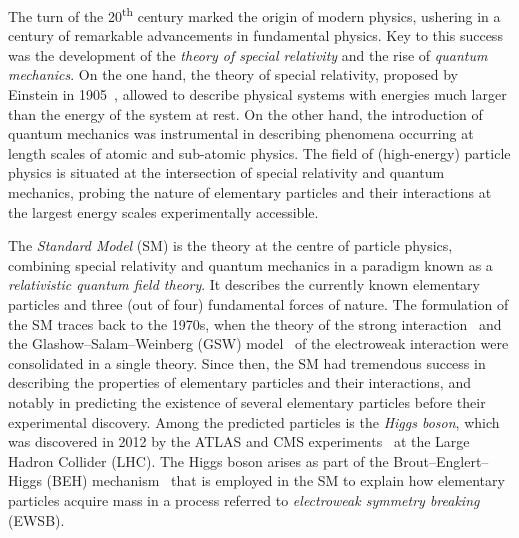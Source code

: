The turn of the 20\textsuperscript{th} century marked the origin of modern
physics, ushering in a century of remarkable advancements in fundamental
physics. Key to this success was the development of the \emph{theory of special
  relativity} and the rise of \emph{quantum mechanics}. On the one hand, the
theory of special relativity, proposed by Einstein in
1905~\cite{einstein:1905zedbk,einstein:1905idtekvsea}, allowed to describe
physical systems with energies much larger than the energy of the system at
rest. On the other hand, the introduction of quantum mechanics was instrumental
in describing phenomena occurring at length scales of atomic and sub-atomic
physics. The field of (high-energy) particle physics is situated at the
intersection of special relativity and quantum mechanics, probing the nature of
elementary particles and their interactions at the largest energy scales
experimentally accessible.

The \emph{Standard Model} (SM) is the theory at the centre of particle physics,
combining special relativity and quantum mechanics in a paradigm known as a
\emph{relativistic quantum field theory}. It describes the currently known
elementary particles and three (out of four) fundamental forces of nature. The
formulation of the SM traces back to the 1970s, when the theory of the strong
interaction~\cite{Fritzsch:1973pi,Gross:1973id,Politzer:1973fx}
and the Glashow--Salam--Weinberg (GSW)
model~\cite{Glashow:1961tr,Salam:1964ry,Weinberg:1967tq} of the electroweak
interaction were consolidated in a single theory. Since then, the SM had
tremendous success in describing the properties of elementary particles and
their interactions, and notably in predicting the existence of several
elementary particles before their experimental discovery. Among the predicted
particles is the \emph{Higgs boson}, which was discovered in 2012 by the ATLAS
and CMS experiments~\cite{HIGG-2012-27,CMS-HIG-12-028} at the Large Hadron
Collider (LHC). The Higgs boson arises as part of the Brout--Englert--Higgs
(BEH) mechanism~\cite{Englert:1964et,Higgs:1964pj}
that is employed in the SM to explain how elementary
particles acquire mass in a process referred to \emph{electroweak symmetry
  breaking} (EWSB).
%
%

